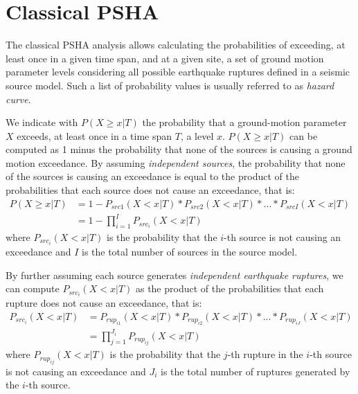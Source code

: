 
\section{Classical PSHA}
The classical PSHA analysis allows calculating the probabilities of exceeding, at least once in a given time
span, and at a given site, a set of ground motion parameter levels considering all possible earthquake ruptures
defined in a seismic source model. Such a list of probability values is usually referred to as \textit{hazard curve}.

We indicate with $P(X \ge x | T)$ the probability that a ground-motion parameter $X$ exceeds, at least once in
a time span $T$, a level $x$. $P(X \ge x | T)$ can be computed as 1 minus the probability that none of the
sources is causing a ground motion exceedance. By assuming \textit{independent sources}, the probability
that none of the sources is causing an exceedance is equal to the product of the probabilities that each source
does not cause an exceedance, that is:
\begin{align}
\label{eq:hazard_eq}
P(X \ge x | T) & =  1 - P_{src1}(X < x | T) * P_{src2}(X < x | T) * ... * P_{srcI}(X < x | T) \nonumber \\
		      & =  1 - \prod_{i=1}^{I} P_{src_{i}}(X < x | T)
\end{align}
where $P_{src_{i}}(X < x | T)$ is the probability that the $i$-th source is not causing an exceedance and $I$ is the
total number of sources in the source model.

By further assuming each source generates \textit{independent
earthquake ruptures}, we can compute $P_{src_{i}}(X < x | T)$ as the product of the probabilities that each rupture
does not cause an exceedance, that is:
\begin{align}
\label{eq:prup_noexceed_src}
P_{src_{i}}(X < x | T) & = P_{rup_{i1}}(X < x | T) * P_{rup_{i2}}(X < x | T) * ... * P_{rup_{iJ}}(X < x | T) \nonumber \\
			        & = \prod_{j=1}^{J_{i}} P_{rup_{ij}}(X < x | T)
\end{align}
where $P_{rup_{ij}}(X < x | T)$ is the probability that the $j$-th rupture in the $i$-th source is not causing an exceedance and $J_{i}$ is
the total number of ruptures generated by the $i$-th source.

